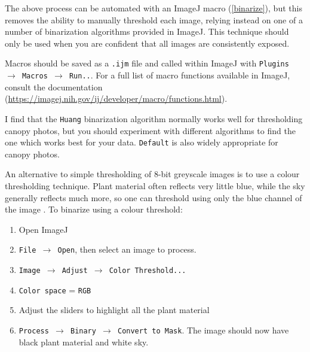 \documentclass[11pt,a4paper]{article}
\newcommand\menu[1]{\texttt{\color{menu}#1}}  %
\newcommand\file[1]{\texttt{\color{file}#1}}  %
\newcommand\numval[1]{\texttt{\color{numval}#1}}  %
\begin{document}
The above process can be automated with an ImageJ macro (\autoref{binarize}), but this removes the ability to manually threshold each image, relying instead on one of a number of binarization algorithms provided in ImageJ. This technique should only be used when you are confident that all images are consistently exposed. 

Macros should be saved as a \file{.ijm} file and called within ImageJ with \menu{Plugins $\rightarrow$ Macros $\rightarrow$ Run..}. For a full list of macro functions available in ImageJ, consult the documentation (\url{https://imagej.nih.gov/ij/developer/macro/functions.html}). 

\begin{minipage}{\linewidth}

\end{minipage}

I find that the \texttt{Huang} \citep{Huang1995} binarization algorithm normally works well for thresholding canopy photos, but you should experiment with different algorithms to find the one which works best for your data. \texttt{Default} is also widely appropriate for canopy photos.

An alternative to simple thresholding of 8-bit greyscale images is to use a colour thresholding technique. Plant material often reflects very little blue, while the sky generally reflects much more, so one can threshold using only the blue channel of the image \citep{Brusa2014}. To binarize using a colour threshold:

\begin{enumerate}
	\item{Open ImageJ}
	\item{\menu{File $\rightarrow{}$ Open}, then select an image to process.}
	\item{\menu{Image $\rightarrow{}$ Adjust $\rightarrow{}$ Color Threshold...}}
	\item{\menu{Color space} = \numval{RGB}}
	\item{Adjust the sliders to highlight all the plant material}
	\item{\menu{Process $\rightarrow{}$ Binary $\rightarrow{}$ Convert to Mask}. The image should now have black plant material and white sky.}
\end{enumerate}
\end{document}
